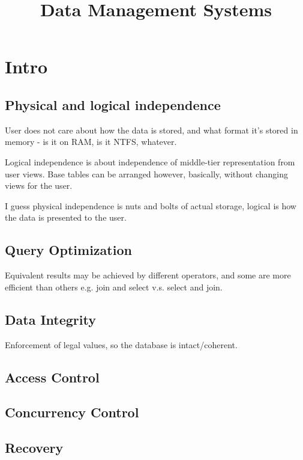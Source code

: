 \documentclass{article}
\begin{document}
\title{Data Management Systems}
\author{}
\date{}

\maketitle

\section{Intro}

	\subsection{Physical and logical independence}
		
		User does not care about how the data is stored, and what format it's stored in memory - is it on RAM, is it NTFS, whatever.
		
		Logical independence is about independence of middle-tier representation from user views. Base tables can be arranged however, basically, without changing views for the user.
		
		I guess physical independence is nuts and bolts of actual storage, logical is how the data is presented to the user.
	
	\subsection{Query Optimization}
	
		Equivalent results may be achieved by different operators, and some are more efficient than others e.g. join and select v.s. select and join.		
		
	\subsection{Data Integrity}
	
		Enforcement of legal values, so the database is intact/coherent.
	
	\subsection{Access Control}
	
	\subsection{Concurrency Control}
	
	\subsection{Recovery}
	
\end{document}
